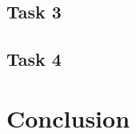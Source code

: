 \documentclass{article}
\begin{document}
\pagebreak{}

\subsection{Task 3}

\pagebreak{}

\subsection{Task 4}



\pagebreak{}

\section{Conclusion}

\pagebreak{}

\begin{appendices}


\end{appendices}

\pagebreak{}

 
 
\end{document}
